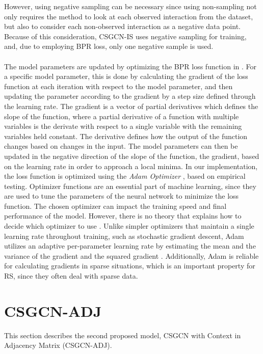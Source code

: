 However, using negative sampling can be necessary since using non-sampling not only requires the method to look at each observed interaction from the dataset, but also to consider each non-observed interaction as a negative data point.
Because of this consideration, CSGCN-IS uses negative sampling for training, and, due to employing BPR loss, only one negative sample is used.
\\\\
The model parameters are updated by optimizing the BPR loss function in .
For a specific model parameter, this is done by calculating the gradient of the loss function at each iteration with respect to the model parameter, and then updating the parameter according to the gradient by a step size defined through the learning rate.
The gradient is a vector of partial derivatives which defines the slope of the function, where a partial derivative of a function with multiple variables is the derivate with respect to a single variable with the remaining variables held constant.
The derivative defines how the output of the function changes based on changes in the input.
The model parameters can then be updated in the negative direction of the slope of the function, the gradient, based on the learning rate in order to approach a local minima. 
In our implementation, the loss function is optimized using the \textit{Adam Optimizer} \cite{AdamOptimizer}, based on empirical testing.
Optimizer functions are an essential part of machine learning, since they are used to tune the parameters of the neural network to minimize the loss function.
The chosen optimizer can impact the training speed and final performance of the model.
However, there is no theory that explains how to decide which optimizer to use \cite{EmpiricalOptimizers}.
Unlike simpler optimizers that maintain a single learning rate throughout training, such as stochastic gradient descent, Adam utilizes an adaptive per-parameter learning rate by estimating the mean and the variance of the gradient and the squared gradient \cite{AdamOptimizer}.
Additionally, Adam is reliable for calculating gradients in sparse situations, which is an important property for RS, since they often deal with sparse data.

\section{CSGCN-ADJ}\label{sec:csgcn_adj}
This section describes the second proposed model, CSGCN with Context in Adjacency Matrix (CSGCN-ADJ).

